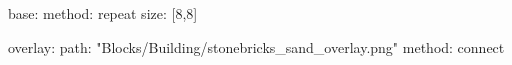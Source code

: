 base:
  method: repeat
  size: [8,8]

overlay:
  path: "Blocks/Building/stonebricks_sand_overlay.png"
  method: connect
